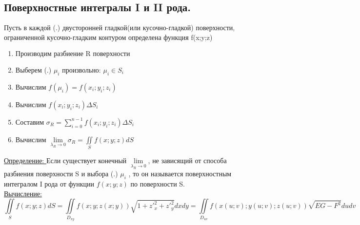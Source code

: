 \documentclass[12pt]{article}
\let\oldiint\iint
\let\oldsum\sum
\let\oldlim\lim
\renewcommand{\iint}{\oldiint\limits}
\renewcommand{\sum}{\oldsum\limits}
\renewcommand{\lim}{\oldlim\limits}
\begin{document}
  \subsection{Поверхностные интегралы I и II рода.}
  Пусть в каждой (.) двусторонней гладкой(или кусочно-гладкой) поверхности, ограниченной кусочно-гладким контуром
  определена функция f(x;y;z)
  \begin{enumerate}
    \item Производим разбиение R поверхности
    \item Выберем (.) $\mu_i$ произвольно: $\mu_i \in S_i$
    \item Вычислим $f(\mu_i) = f(x_i;y_i;z_i)$
    \item Вычислим $f(x_i;y_i;z_i)\Delta S_i$
    \item Составим $\sigma_R=\sum_{i=0}^{n-1}f(x_i;y_i;z_i)\Delta S_i$
    \item Вычислим $\lim_{\lambda_R \to 0} \sigma_R = \iint_{S} f(x;y;z)dS$
  \end{enumerate}
  \underline{Определение: }Если существует конечный $\lim_{\lambda_R \to 0}$, не зависящий от способа разбиения поверхности
  S и выбора (.) $\mu_i$ , то он называется поверхностным интегралом I рода от функции $f(x;y;z)$ по поверхности S.\\
  \underline{Вычисление: } 
  \[ \iint_S f(x;y;z)dS=\iint_{D_{xy}}f(x;y;z(x;y)) \sqrt{1+z'^2_x+z'^2_y}dxdy = 
  \iint_{D_{uv}} f(x(u;v);y(u;v);z(u;v))\sqrt{EG-F^2}dudv\]
\end{document}
